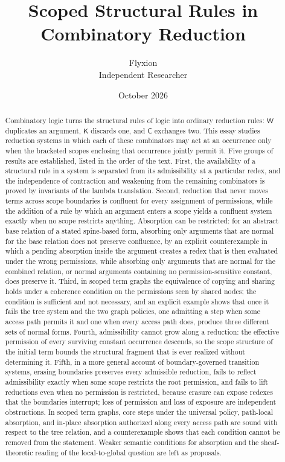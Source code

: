 \documentclass[11pt]{article}
\title{Scoped Structural Rules in Combinatory Reduction}
\author{Flyxion\\Independent Researcher}
\date{October 2026}
\theoremstyle{definition}
\theoremstyle{remark}
\newcommand{\cC}{\mathsf{C}}
\newcommand{\cK}{\mathsf{K}}
\newcommand{\cW}{\mathsf{W}}
\begin{document}
\maketitle

\begin{abstract}
\noindent Combinatory logic turns the structural rules of logic into ordinary reduction rules: $\cW$ duplicates an argument, $\cK$ discards one, and $\cC$ exchanges two. This essay studies reduction systems in which each of these combinators may act at an occurrence only when the bracketed scopes enclosing that occurrence jointly permit it. Five groups of results are established, listed in the order of the text. First, the availability of a structural rule in a system is separated from its admissibility at a particular redex, and the independence of contraction and weakening from the remaining combinators is proved by invariants of the lambda translation. Second, reduction that never moves terms across scope boundaries is confluent for every assignment of permissions, while the addition of a rule by which an argument enters a scope yields a confluent system exactly when no scope restricts anything. Absorption can be restricted: for an abstract base relation of a stated spine-based form, absorbing only arguments that are normal for the base relation does not preserve confluence, by an explicit counterexample in which a pending absorption inside the argument creates a redex that is then evaluated under the wrong permissions, while absorbing only arguments that are normal for the combined relation, or normal arguments containing no permission-sensitive constant, does preserve it. Third, in scoped term graphs the equivalence of copying and sharing holds under a coherence condition on the permissions seen by shared nodes; the condition is sufficient and not necessary, and an explicit example shows that once it fails the tree system and the two graph policies, one admitting a step when some access path permits it and one when every access path does, produce three different sets of normal forms. Fourth, admissibility cannot grow along a reduction: the effective permission of every surviving constant occurrence descends, so the scope structure of the initial term bounds the structural fragment that is ever realized without determining it. Fifth, in a more general account of boundary-governed transition systems, erasing boundaries preserves every admissible reduction, fails to reflect admissibility exactly when some scope restricts the root permission, and fails to lift reductions even when no permission is restricted, because erasure can expose redexes that the boundaries interrupt; loss of permission and loss of exposure are independent obstructions. In scoped term graphs, core steps under the universal policy, path-local absorption, and in-place absorption authorized along every access path are sound with respect to the tree relation, and a counterexample shows that each condition cannot be removed from the statement. Weaker semantic conditions for absorption and the sheaf-theoretic reading of the local-to-global question are left as proposals.
\end{abstract}
\end{document}
